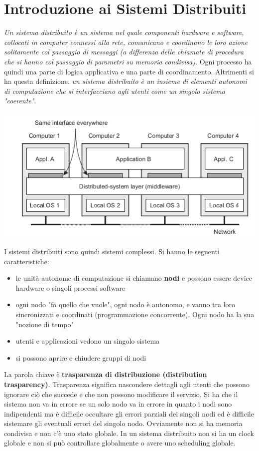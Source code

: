 \documentclass[a4paper,12pt, oneside]{book}
\begin{document}
\chapter{Introduzione ai Sistemi Distribuiti}
\textit{Un sistema distribuito è un sistema nel quale componenti hardware e software, collocati in computer connessi alla rete, comunicano e coordinano le loro azione solitamente col passaggio di messaggi (a differenza delle chiamate di procedura che si hanno col passaggio di parametri su memoria condivisa)}. Ogni processo ha quindi una parte di logica applicativa e una parte di coordinamento. Altrimenti si ha questa definizione. \textit{un sistema distribuito è un insieme di elementi autonomi di computazione che si interfacciano agli utenti come un singolo sistema "coerente"}.
\begin{center}
\includegraphics[scale=2.5]{img/cli.png}
\end{center}
I sistemi distribuiti sono quindi sistemi complessi. Si hanno le seguenti caratteristiche:
\begin{itemize}
\item le unità autonome di computazione si chiamano \textbf{nodi} e possono essere device hardware o singoli processi software
\item ogni nodo "fa quello che vuole", ogni nodo è autonomo, e vanno tra loro sincronizzati e coordinati (programmazione concorrente). Ogni nodo ha la sua "nozione di tempo"
\item utenti e applicazioni vedono un singolo sistema
\item si possono aprire e chiudere gruppi di nodi
\end{itemize}
La parola chiave è \textbf{trasparenza di distribuzione (distribution trasparency)}. Trasparenza significa nascondere dettagli agli utenti che possono ignorare ciò che succede e che non possono modificare il servizio. Si ha che il sistema non va in errore se un solo nodo va in errore in quanto i nodi sono indipendenti ma è difficile occultare gli errori parziali dei singoli nodi ed è difficile sistemare gli eventuali errori del singolo nodo. Ovviamente non si ha memoria condivisa e non c'è uno stato globale. In un sistema distribuito non si ha un clock globale e non si può controllare globalmente o avere uno scheduling globale.
\end{document}
